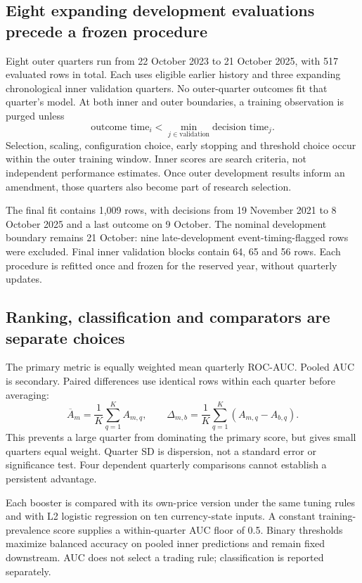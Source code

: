 \documentclass[11pt,a4paper]{article}
\begin{document}
\subsection*{Eight expanding development evaluations precede a frozen procedure}
Eight outer quarters run from 22 October 2023 to 21 October 2025, with 517 evaluated rows in total. Each uses eligible earlier history and three expanding chronological inner validation quarters. No outer-quarter outcomes fit that quarter's model. At both inner and outer boundaries, a training observation is purged unless
\[
\text{outcome time}_i < \min_{j\in\mathrm{validation}}\text{decision time}_j.
\]
Selection, scaling, configuration choice, early stopping and threshold choice occur within the outer training window. Inner scores are search criteria, not independent performance estimates. Once outer development results inform an amendment, those quarters also become part of research selection.

The final fit contains 1,009 rows, with decisions from 19 November 2021 to 8 October 2025 and a last outcome on 9 October. The nominal development boundary remains 21 October: nine late-development event-timing-flagged rows were excluded. Final inner validation blocks contain 64, 65 and 56 rows. Each procedure is refitted once and frozen for the reserved year, without quarterly updates.

\subsection*{Ranking, classification and comparators are separate choices}
The primary metric is equally weighted mean quarterly ROC-AUC. Pooled AUC is secondary. Paired differences use identical rows within each quarter before averaging:
\[
\overline A_m=\frac1K\sum_{q=1}^K A_{m,q},\qquad
\Delta_{m,b}=\frac1K\sum_{q=1}^K(A_{m,q}-A_{b,q}).
\]
This prevents a large quarter from dominating the primary score, but gives small quarters equal weight. Quarter SD is dispersion, not a standard error or significance test. Four dependent quarterly comparisons cannot establish a persistent advantage.

Each booster is compared with its own-price version under the same tuning rules and with L2 logistic regression on ten currency-state inputs. A constant training-prevalence score supplies a within-quarter AUC floor of 0.5. Binary thresholds maximize balanced accuracy on pooled inner predictions and remain fixed downstream. AUC does not select a trading rule; classification is reported separately.
\end{document}
